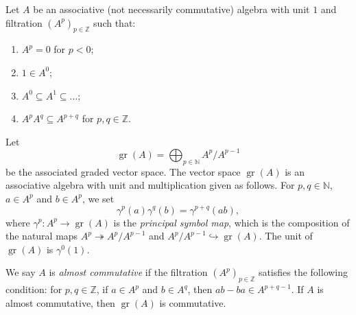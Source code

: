 \documentclass[a4paper, 12pt, reqno]{amsart}
\theoremstyle{remark}
\DeclareMathOperator{\gr}{gr}
\begin{document}
Let $A$ be an associative (not necessarily commutative) algebra with unit $1$ and filtration $(A^p)_{p \in \mathbb{Z}}$ such that:
\begin{enumerate}
\item $A^p = 0$ for $p < 0$;
\item $1 \in A^0$;
\item $A^0 \subseteq A^1 \subseteq \dots$;
\item $A^pA^q \subseteq A^{p + q}$ for $p, q \in \mathbb{Z}$.
\end{enumerate}
Let
\begin{equation*}
  \gr(A) = \bigoplus_{p \in \mathbb{N}}A^p/A^{p - 1}
\end{equation*}
be the associated graded vector space.
The vector space $\gr(A)$ is an associative algebra with unit and multiplication given as follows.
For $p, q \in \mathbb{N}$, $a \in A^p$ and $b \in A^p$, we set
\begin{equation*}
  \gamma^p(a)\gamma^q(b) = \gamma^{p + q}(ab),
\end{equation*}
where $\gamma^p: A^p \to \gr(A)$ is the \emph{principal symbol map}, which is the composition of the natural maps $A^p \twoheadrightarrow A^p/A^{p - 1}$ and $A^p/A^{p - 1} \hookrightarrow \gr(A)$.
The unit of $\gr(A)$ is $\gamma^0(1)$.

We say $A$ is \emph{almost commutative} if the filtration $(A^p)_{p \in \mathbb{Z}}$ satisfies the following condition: for $p, q \in \mathbb{Z}$, if $a \in A^p$ and $b \in A^q$, then $ab - ba \in A^{p + q - 1}$.
If $A$ is almost commutative, then $\gr(A)$ is commutative.
\end{document}
